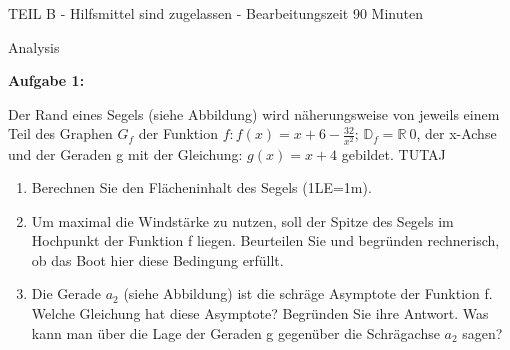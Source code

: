 \documentclass[a4paper,12pt]{article}
\newcommand{\Aufgabe}[1]{
  {
  \vspace*{0.5cm}
  \textsf{\textbf{Aufgabe #1}}
  \vspace*{0.2cm}
  
  }
}
\begin{document}
\begin{figure}[H]
{    }      %


\end{figure}

\newpage



\vspace{0,5cm} {TEIL B} -  Hilfsmittel sind zugelassen - Bearbeitungszeit 90 Minuten

\vspace{0,5cm} Analysis
\Aufgabe {1:}
Der Rand eines Segels (siehe Abbildung) wird näherungsweise von jeweils einem Teil des Graphen $G_f$ der Funktion $f: f(x)=x+6-\frac{32}{x^2}$;
$ \mathbb{D}_f= \mathbb{R}\  {0}$, der x-Achse und der Geraden g mit der Gleichung: $g(x)=x+4$ gebildet.
TUTAJ
\begin{enumerate}[label={\alph*)}]
\item Berechnen Sie den Flächeninhalt des Segels (1LE=1m).
\item Um maximal die Windstärke zu nutzen, soll der Spitze des Segels im Hochpunkt der Funktion f liegen. Beurteilen Sie und begründen rechnerisch, ob das Boot hier diese Bedingung erfüllt. 
\item Die Gerade $a_2$ (siehe Abbildung) ist die schräge Asymptote der Funktion f. Welche Gleichung hat diese Asymptote? Begründen Sie ihre Antwort. Was kann man über die Lage der Geraden g gegenüber die Schrägachse $a_2$ sagen? 
\end{enumerate}  
\end{document}
